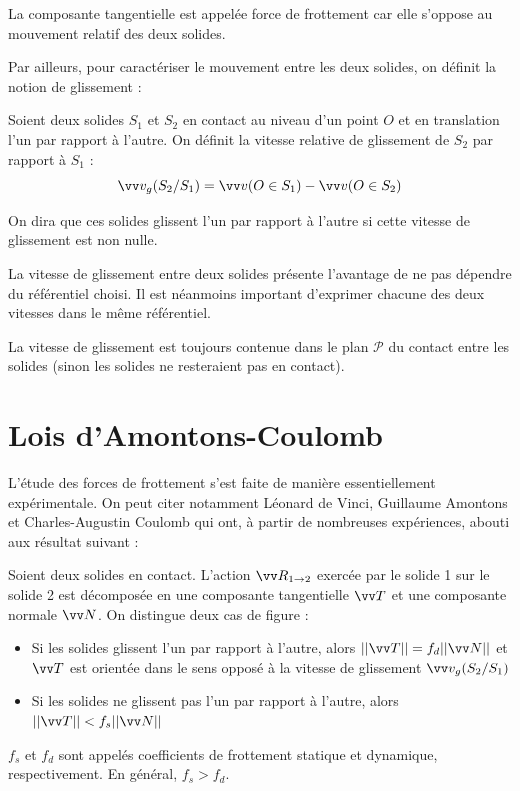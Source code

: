 \documentclass[11pt,fleqn]{book} %
\begin{document}
La composante tangentielle est appelée force de frottement car elle s'oppose au mouvement relatif des deux solides. 

Par ailleurs, pour caractériser le mouvement entre les deux solides, on définit la notion de glissement :

\begin{definition}
    Soient deux solides $S_1$ et $S_2$ en contact au niveau d'un point $O$ et en translation l'un par rapport à l'autre. On définit la vitesse relative de glissement de $S_2$ par rapport à $S_1$ :
    \begin{equation}
        \vv v_g(S_2/S_1) = \vv v(O\in S_1) - \vv v(O \in S_2)
    \end{equation}
    
    On dira que ces solides glissent l'un par rapport à l'autre si cette vitesse de glissement est non nulle.
\end{definition}

\begin{remark}
    La vitesse de glissement entre deux solides présente l'avantage de ne pas dépendre du référentiel choisi. Il est néanmoins important d'exprimer chacune des deux vitesses dans le même référentiel.

    La vitesse de glissement est toujours contenue dans le plan $\mathcal{P}$ du contact entre les solides (sinon les solides ne resteraient pas en contact).
\end{remark}

\section{Lois d'Amontons-Coulomb}

L'étude des forces de frottement s'est faite de manière essentiellement expérimentale. On peut citer notamment Léonard de Vinci, Guillaume Amontons et Charles-Augustin Coulomb qui ont, à partir de nombreuses expériences, abouti aux résultat suivant :

\begin{theorem}
    Soient deux solides en contact. L'action $\vv R_{1 \rightarrow 2}$ exercée par le solide 1 sur le solide 2 est décomposée en une composante tangentielle $\vv T$ et une composante normale $\vv N$. On distingue deux cas de figure :
    \begin{itemize}
        \item Si les solides glissent l'un par rapport à l'autre, alors $||\vv T|| = f_d ||\vv N||$ et $\vv T$ est orientée dans le sens opposé à la vitesse de glissement $\vv v_g(S_2/S_1)$
        \item Si les solides ne glissent pas l'un par rapport à l'autre, alors $||\vv T|| < f_s ||\vv N||$
    \end{itemize}
    $f_s$ et $f_d$ sont appelés coefficients de frottement statique et dynamique, respectivement. En général, $f_s > f_d$.
\end{theorem}
\end{document}
